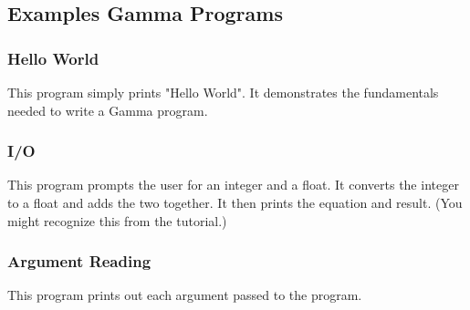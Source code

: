 \subsection{Examples Gamma Programs}
\subsubsection{Hello World}
This program simply prints "Hello World". It demonstrates the fundamentals needed to write a Gamma program.





\subsubsection{I/O}
This program prompts the user for an integer and a float. It converts the integer to a float and adds the two together. It then prints the equation and result. (You might recognize this from the tutorial.)





\subsubsection{Argument Reading}
This program prints out each argument passed to the program.



